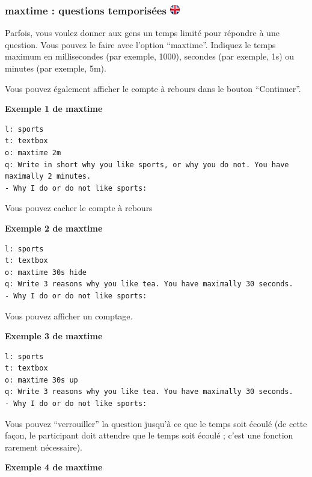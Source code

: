 \documentclass[
]{book}
\begin{document}
\hypertarget{maxtime-questions-temporisuxe9es}{%
\subsubsection[maxtime : questions temporisées ]{\texorpdfstring{maxtime
: questions temporisées
\href{https://www.psytoolkit.org/doc3.1.0/online-survey-syntax.html\#maxtime}{\protect\includegraphics{img/ukflag.png}}}{maxtime : questions temporisées }}\label{maxtime-questions-temporisuxe9es}}

Parfois, vous voulez donner aux gens un temps limité pour répondre à une
question. Vous pouvez le faire avec l'option ``maxtime''. Indiquez le
temps maximum en millisecondes (par exemple, 1000), secondes (par
exemple, 1s) ou minutes (par exemple, 5m).

Vous pouvez également afficher le compte à rebours dans le bouton
``Continuer''.

\textbf{Exemple 1 de maxtime}

\begin{verbatim}
l: sports
t: textbox
o: maxtime 2m
q: Write in short why you like sports, or why you do not. You have maximally 2 minutes.
- Why I do or do not like sports:
\end{verbatim}

Vous pouvez cacher le compte à rebours

\textbf{Exemple 2 de maxtime}

\begin{verbatim}
l: sports
t: textbox
o: maxtime 30s hide
q: Write 3 reasons why you like tea. You have maximally 30 seconds.
- Why I do or do not like sports:
\end{verbatim}

Vous pouvez afficher un comptage.

\textbf{Exemple 3 de maxtime}

\begin{verbatim}
l: sports
t: textbox
o: maxtime 30s up
q: Write 3 reasons why you like tea. You have maximally 30 seconds.
- Why I do or do not like sports:
\end{verbatim}

Vous pouvez ``verrouiller'' la question jusqu'à ce que le temps soit
écoulé (de cette façon, le participant doit attendre que le temps soit
écoulé ; c'est une fonction rarement nécessaire).

\textbf{Exemple 4 de maxtime}
\end{document}
